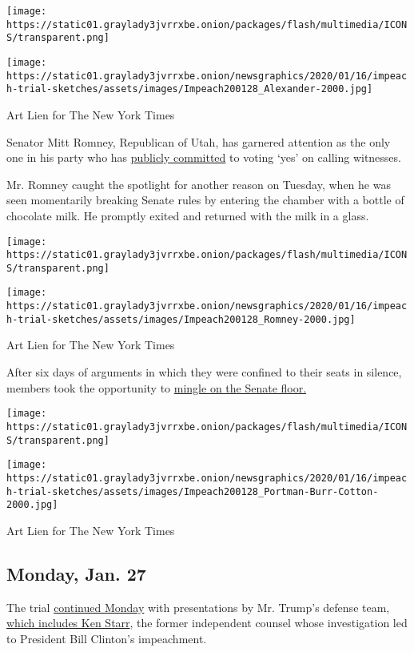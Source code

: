 \texttt{[image: https://static01.graylady3jvrrxbe.onion/packages/flash/multimedia/ICONS/transparent.png]}

\texttt{[image: https://static01.graylady3jvrrxbe.onion/newsgraphics/2020/01/16/impeach-trial-sketches/assets/images/Impeach200128\_Alexander-2000.jpg]}

Art Lien for The New York Times

Senator Mitt Romney, Republican of Utah, has garnered attention as the
only one in his party who has
\href{https://www.nytimes3xbfgragh.onion/2020/01/27/us/politics/john-bolton-impeachment-witness.html}{publicly
committed} to voting `yes' on calling witnesses.

Mr. Romney caught the spotlight for another reason on Tuesday, when he
was seen momentarily breaking Senate rules by entering the chamber with
a bottle of chocolate milk. He promptly exited and returned with the
milk in a glass.

\texttt{[image: https://static01.graylady3jvrrxbe.onion/packages/flash/multimedia/ICONS/transparent.png]}

\texttt{[image: https://static01.graylady3jvrrxbe.onion/newsgraphics/2020/01/16/impeach-trial-sketches/assets/images/Impeach200128\_Romney-2000.jpg]}

Art Lien for The New York Times

After six days of arguments in which they were confined to their seats
in silence, members took the opportunity to
\href{https://www.nytimes3xbfgragh.onion/live/2020/impeachment-trial-live-01-28\#what-c-span-viewers-didnt-see-once-the-defense-ended-its-arguments}{mingle
on the Senate floor.}

\texttt{[image: https://static01.graylady3jvrrxbe.onion/packages/flash/multimedia/ICONS/transparent.png]}

\texttt{[image: https://static01.graylady3jvrrxbe.onion/newsgraphics/2020/01/16/impeach-trial-sketches/assets/images/Impeach200128\_Portman-Burr-Cotton-2000.jpg]}

Art Lien for The New York Times

\hypertarget{monday-jan-27}{%
\subsection{Monday, Jan. 27}\label{monday-jan-27}}

The trial
\href{https://www.nytimes3xbfgragh.onion/2020/01/27/us/politics/impeachment-live.html}{continued
Monday} with presentations by Mr. Trump's defense team,
\href{https://www.nytimes3xbfgragh.onion/2020/01/17/us/politics/ken-starr-impeachment-trump-clinton.html}{which
includes Ken Starr}, the former independent counsel whose investigation
led to President Bill Clinton's impeachment.


